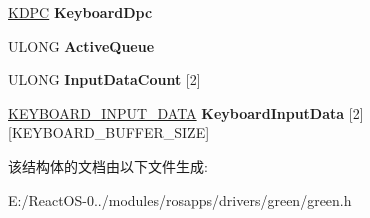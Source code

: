 \begin{DoxyCompactItemize}
\hyperlink{struct___k_d_p_c}{K\+D\+PC} {\bfseries Keyboard\+Dpc}
\item 
\mbox{\label{struct___k_e_y_b_o_a_r_d___d_e_v_i_c_e___e_x_t_e_n_s_i_o_n_afadb0e32c2d1b34ac4612845850aabcf}} 
U\+L\+O\+NG {\bfseries Active\+Queue}
\item 
\mbox{\label{struct___k_e_y_b_o_a_r_d___d_e_v_i_c_e___e_x_t_e_n_s_i_o_n_a1d8fe19ced690c314e5dca580b879257}} 
U\+L\+O\+NG {\bfseries Input\+Data\+Count} \mbox{[}2\mbox{]}
\item 
\mbox{\label{struct___k_e_y_b_o_a_r_d___d_e_v_i_c_e___e_x_t_e_n_s_i_o_n_aa4ebf46c606104da3993881d1ba171f5}} 
\hyperlink{struct___k_e_y_b_o_a_r_d___i_n_p_u_t___d_a_t_a}{K\+E\+Y\+B\+O\+A\+R\+D\+\_\+\+I\+N\+P\+U\+T\+\_\+\+D\+A\+TA} {\bfseries Keyboard\+Input\+Data} \mbox{[}2\mbox{]}\mbox{[}K\+E\+Y\+B\+O\+A\+R\+D\+\_\+\+B\+U\+F\+F\+E\+R\+\_\+\+S\+I\+ZE\mbox{]}
\end{DoxyCompactItemize}


该结构体的文档由以下文件生成\+:\begin{DoxyCompactItemize}
\item 
E\+:/\+React\+O\+S-\/0../modules/rosapps/drivers/green/green.\+h\end{DoxyCompactItemize}
